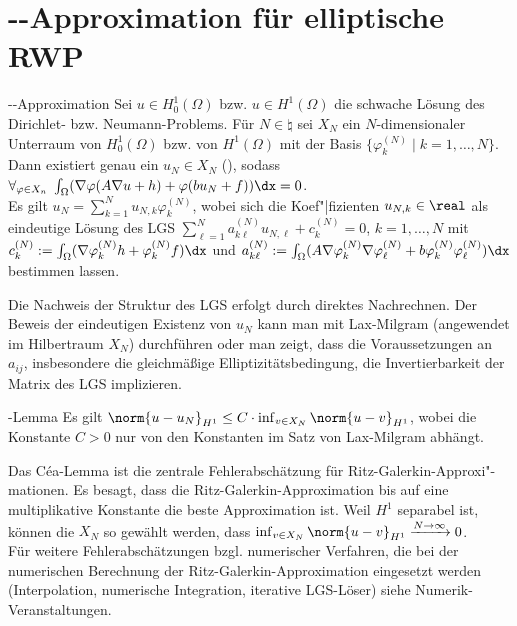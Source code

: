 \section{%
    --Approximation für elliptische RWP%
}

\begin{Satz}{--Approximation}
    Sei $u \in H^1_0(\Omega)$ bzw. $u \in H^1(\Omega)$ die schwache Lösung des
    Dirichlet- bzw. Neumann-Problems.
    Für $N \in \natural$ sei $X_N$ ein $N$-dimensionaler
    Unterraum von $H_0^1(\Omega)$ bzw. von $H^1(\Omega)$
    mit der Basis $\{\varphi_k^{(N)} \;|\; k = 1, \dotsc, N\}$.\\
    Dann existiert genau ein $u_N \in X_N$
    (), sodass\\
    $\forall_{\varphi \in X_n}\;
    \int_\Omega (\nabla \varphi (A \nabla u + h) + \varphi(bu_N + f))\dx = 0$.\\
    Es gilt $u_N = \sum_{k=1}^N u_{N,k} \varphi_k^{(N)}$,
    wobei sich die Koef"|fizienten $u_{N,k} \in \real$ als eindeutige Lösung des LGS
    $\sum_{\ell=1}^N a_{k\ell}^{(N)} u_{N,\ell} + c_k^{(N)} = 0$, $k = 1, \dotsc, N$ mit
    $c_k^{(N)} := \int_\Omega (\nabla \varphi_k^{(N)} h + \varphi_k^{(N)} f)\dx$ und
    $a_{k\ell}^{(N)} := \int_\Omega (A \nabla \varphi_k^{(N)} \nabla \varphi_\ell^{(N)} + b\varphi_k^{(N)} \varphi_\ell^{(N)}) \dx$
    bestimmen lassen.
\end{Satz}

\begin{Bem}
    Die Nachweis der Struktur des LGS erfolgt durch direktes Nachrechnen.
    Der Beweis der eindeutigen Existenz von $u_N$ kann man mit Lax-Milgram
    (angewendet im Hilbertraum $X_N$) durchführen
    oder man zeigt, dass die Voraussetzungen an $a_{ij}$,
    insbesondere die gleichmäßige Elliptizitätsbedingung,
    die Invertierbarkeit der Matrix des LGS implizieren.
\end{Bem}

\linie

\begin{Lemma}{-Lemma}
    Es gilt $\norm{u - u_N}_{H^1} \le C \cdot \inf_{v \in X_N} \norm{u - v}_{H^1}$,
    wobei die Konstante $C > 0$ nur von den Konstanten im Satz von Lax-Milgram abhängt.
\end{Lemma}

\begin{Bem}
    Das Céa-Lemma ist die zentrale Fehlerabschätzung für Ritz-Galerkin-Approxi"-mationen.
    Es besagt, dass die Ritz-Galerkin-Approximation bis auf eine multiplikative Konstante
    die beste Approximation ist.
    Weil $H^1$ separabel ist, können die $X_N$ so gewählt werden, dass
    $\inf_{v \in X_N} \norm{u - v}_{H^1} \xrightarrow{N \to \infty} 0$.\\
    Für weitere Fehlerabschätzungen bzgl. numerischer Verfahren, die bei der numerischen Berechnung
    der Ritz-Galerkin-Approximation eingesetzt werden
    (Interpolation, numerische Integra\-tion, iterative LGS-Löser) siehe Numerik-Veranstaltungen.
\end{Bem}

\pagebreak
